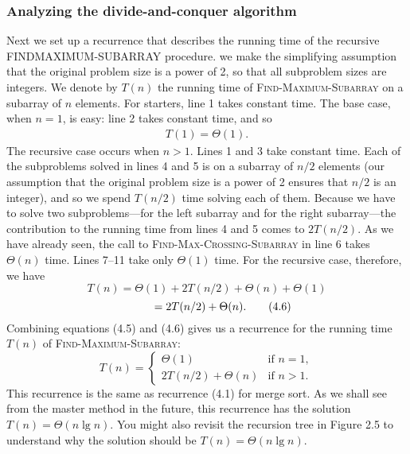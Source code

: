 \documentclass{report}
\begin{document}
        \subsubsection{Analyzing the divide-and-conquer algorithm}
        \bigbreak \noindent 
        Next we set up a recurrence that describes the running time of the recursive FINDMAXIMUM-SUBARRAY procedure. we make the simplifying assumption that the original problem size is a power of 2, so that all subproblem sizes are integers.
        \bigbreak \noindent 
        We denote by \( T(n) \) the running time of \textsc{Find-Maximum-Subarray} on a subarray of \( n \) elements. For starters, line 1 takes constant time. The base case, when \( n = 1 \), is easy: line 2 takes constant time, and so
        \begin{align*}
            T(1) = \Theta(1)
        .\end{align*}
        \bigbreak \noindent 
        The recursive case occurs when \( n > 1 \). Lines 1 and 3 take constant time. Each of the subproblems solved in lines 4 and 5 is on a subarray of \( n/2 \) elements (our assumption that the original problem size is a power of 2 ensures that \( n/2 \) is an integer), and so we spend \( T(n/2) \) time solving each of them. Because we have to solve two subproblems---for the left subarray and for the right subarray---the contribution to the running time from lines 4 and 5 comes to \( 2T(n/2) \). As we have already seen, the call to \textsc{Find-Max-Crossing-Subarray} in line 6 takes \( \Theta(n) \) time. Lines 7--11 take only \( \Theta(1) \) time. For the recursive case, therefore, we have
        \[
            T(n) = \Theta(1) + 2T(n/2) + \Theta(n) + \Theta(1)
        \]
        \[
            \hspace{10mm} = 2T(n/2) + \Theta(n) . \tag{4.6}
        \]
        Combining equations (4.5) and (4.6) gives us a recurrence for the running time \( T(n) \) of \textsc{Find-Maximum-Subarray}:
        \[
            T(n) =
            \begin{cases}
                \Theta(1) & \text{if } n = 1 , \\
                2T(n/2) + \Theta(n) & \text{if } n > 1 .
            \end{cases} \tag{4.7}
        \]
        This recurrence is the same as recurrence (4.1) for merge sort. As we shall see from the master method in the future, this recurrence has the solution \( T(n) = \Theta(n \lg n) \). You might also revisit the recursion tree in Figure 2.5 to understand why the solution should be \( T(n) = \Theta(n \lg n) \).
        \bigbreak \noindent 
\end{document}
